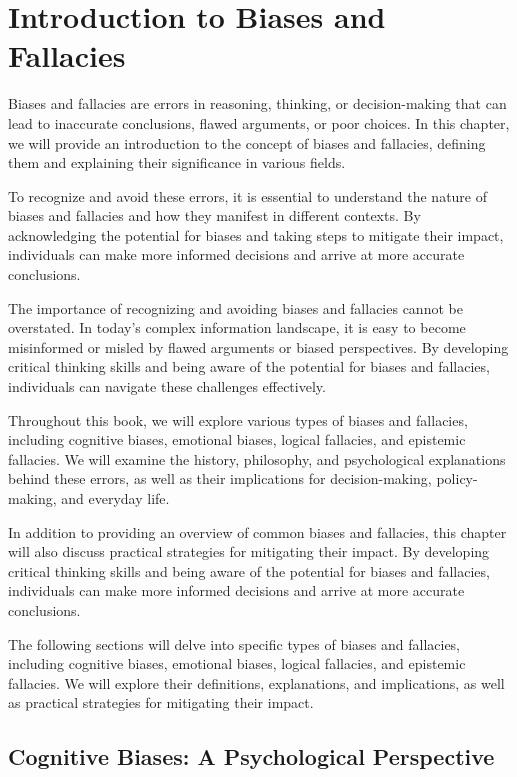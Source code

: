 \chapter{Introduction to Biases and Fallacies}

Biases and fallacies are errors in reasoning, thinking, or decision-making that can lead to inaccurate conclusions, flawed arguments, or poor choices. In this chapter, we will provide an introduction to the concept of biases and fallacies, defining them and explaining their significance in various fields.

To recognize and avoid these errors, it is essential to understand the nature of biases and fallacies and how they manifest in different contexts. By acknowledging the potential for biases and taking steps to mitigate their impact, individuals can make more informed decisions and arrive at more accurate conclusions.

The importance of recognizing and avoiding biases and fallacies cannot be overstated. In today's complex information landscape, it is easy to become misinformed or misled by flawed arguments or biased perspectives. By developing critical thinking skills and being aware of the potential for biases and fallacies, individuals can navigate these challenges effectively.

Throughout this book, we will explore various types of biases and fallacies, including cognitive biases, emotional biases, logical fallacies, and epistemic fallacies. We will examine the history, philosophy, and psychological explanations behind these errors, as well as their implications for decision-making, policy-making, and everyday life.

In addition to providing an overview of common biases and fallacies, this chapter will also discuss practical strategies for mitigating their impact. By developing critical thinking skills and being aware of the potential for biases and fallacies, individuals can make more informed decisions and arrive at more accurate conclusions.

The following sections will delve into specific types of biases and fallacies, including cognitive biases, emotional biases, logical fallacies, and epistemic fallacies. We will explore their definitions, explanations, and implications, as well as practical strategies for mitigating their impact.

\section{Cognitive Biases: A Psychological Perspective}

